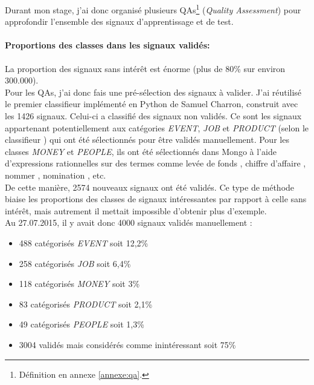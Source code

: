                 Durant mon stage, j'ai donc organisé plusieurs QAs\footnote{Définition en annexe \ref{annexe:qa}.} (\textit{Quality Assessment}) pour approfondir l'ensemble des signaux d’apprentissage et de test.

                \paragraph{Proportions des classes dans les signaux validés:}
                La proportion des signaux sans intérêt est énorme (plus de 80\% sur environ 300.000).\\
                Pour les QAs, j'ai donc fais une pré-sélection des signaux à valider. J'ai réutilisé le premier classifieur implémenté en Python de Samuel Charron, construit avec les 1426 signaux. Celui-ci a classifié des signaux non validés. Ce sont les signaux appartenant potentiellement aux catégories \textit{EVENT}, \textit{JOB} et \textit{PRODUCT} (\og selon le classifieur \fg) qui ont été sélectionnés pour être validés manuellement. Pour les classes \textit{MONEY} et \textit{PEOPLE}, ils ont été sélectionnés dans Mongo à l'aide d'expressions rationnelles sur des termes comme \og levée de fonds \fg, \og chiffre d'affaire \fg, \og nommer \fg, \og nomination \fg, etc.\\

                De cette manière, 2574 nouveaux signaux ont été validés. Ce type de méthode biaise les proportions des classes de signaux intéressantes par rapport à celle sans intérêt, mais autrement il mettait impossible d'obtenir plus d'exemple.\\

                Au 27.07.2015, il y avait donc 4000 signaux validés manuellement :
                \begin{itemize}
                    \item 488 catégorisés \textit{EVENT} soit 12,2\%
                    \item 258 catégorisés \textit{JOB} soit 6,4\%
                    \item 118 catégorisés \textit{MONEY} soit 3\%
                    \item 83 catégorisés \textit{PRODUCT} soit 2,1\%
                    \item 49 catégorisés \textit{PEOPLE} soit 1,3\%
                    \item 3004 validés mais considérés comme inintéressant soit 75\%
                \end{itemize}

